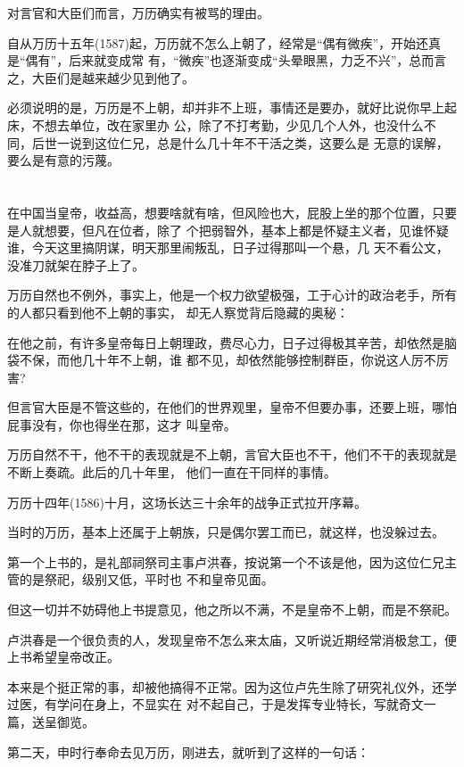 \documentclass[11pt,a4paper,onecolumn]{article}
\begin{document}
对言官和大臣们而言，万历确实有被骂的理由。

自从万历十五年(1587)起，万历就不怎么上朝了，经常是``偶有微疾''，开始还真是``偶有''，后来就变成常
有，``微疾''也逐渐变成``头晕眼黑，力乏不兴''，总而言之，大臣们是越来越少见到他了。

必须说明的是，万历是不上朝，却并非不上班，事情还是要办，就好比说你早上起床，不想去单位，改在家里办
公，除了不打考勤，少见几个人外，也没什么不同，后世一说到这位仁兄，总是什么几十年不干活之类，这要么是
无意的误解，要么是有意的污蔑。

\section[\thesection]{}

在中国当皇帝，收益高，想要啥就有啥，但风险也大，屁股上坐的那个位置，只要是人就想要，但凡在位者，除了
个把弱智外，基本上都是怀疑主义者，见谁怀疑谁，今天这里搞阴谋，明天那里闹叛乱，日子过得那叫一个悬，几
天不看公文，没准刀就架在脖子上了。

万历自然也不例外，事实上，他是一个权力欲望极强，工于心计的政治老手，所有的人都只看到他不上朝的事实，
却无人察觉背后隐藏的奥秘：

在他之前，有许多皇帝每日上朝理政，费尽心力，日子过得极其辛苦，却依然是脑袋不保，而他几十年不上朝，谁
都不见，却依然能够控制群臣，你说这人厉不厉害?

但言官大臣是不管这些的，在他们的世界观里，皇帝不但要办事，还要上班，哪怕屁事没有，你也得坐在那，这才
叫皇帝。

万历自然不干，他不干的表现就是不上朝，言官大臣也不干，他们不干的表现就是不断上奏疏。此后的几十年里，
他们一直在干同样的事情。

万历十四年(1586)十月，这场长达三十余年的战争正式拉开序幕。

当时的万历，基本上还属于上朝族，只是偶尔罢工而已，就这样，也没躲过去。

第一个上书的，是礼部祠祭司主事卢洪春，按说第一个不该是他，因为这位仁兄主管的是祭祀，级别又低，平时也
不和皇帝见面。

但这一切并不妨碍他上书提意见，他之所以不满，不是皇帝不上朝，而是不祭祀。

卢洪春是一个很负责的人，发现皇帝不怎么来太庙，又听说近期经常消极怠工，便上书希望皇帝改正。

本来是个挺正常的事，却被他搞得不正常。因为这位卢先生除了研究礼仪外，还学过医，有学问在身上，不显实在
对不起自己，于是发挥专业特长，写就奇文一篇，送呈御览。

第二天，申时行奉命去见万历，刚进去，就听到了这样的一句话：
\end{document}
